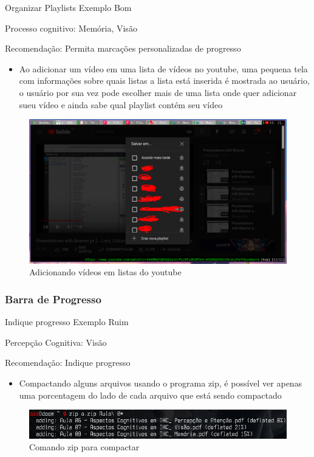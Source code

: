 \documentclass{beamer}
\begin{document}
\begin{frame}{Organizar Playlists Exemplo Bom}

Processo cognitivo: Memória, Visão

Recomendação: Permita marcações personalizadas de progresso

\begin{itemize}
    \item Ao adicionar um vídeo em uma lista de vídeos no youtube, uma pequena tela com informações sobre quais listas a lista está inserida é mostrada ao usuário, o usuário por sua vez pode escolher mais de uma lista onde quer adicionar sueu vídeo e ainda sabe qual playlist contém seu vídeo
\end{itemize}
\begin{figure}
    \centering
    \includegraphics[scale=0.2]{images/youtube-playlist.png}
    \caption{Adicionando vídeos em listas do youtube}
\end{figure}

\end{frame}

\subsubsection{Barra de Progresso}

\begin{frame}{Indique progresso Exemplo Ruim}

Percepção Cognitiva: Visão

Recomendação: Indique progresso

\begin{itemize}
    \item Compactando alguns arquivos usando o programa zip, é possível ver apenas uma porcentagem do lado de cada arquivo que está sendo compactado
\end{itemize}
\begin{figure}
    \centering
    \includegraphics[scale=0.5]{images/unzip.png}
    \caption{Comando zip para compactar}
\end{figure}
\end{frame}
\end{document}

